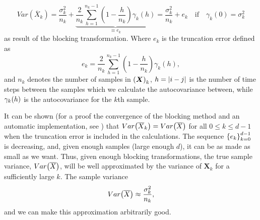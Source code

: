 \begin{equation*}
Var(\overline{X}_k) = \frac{\sigma_k^2}{n_k} + \underbrace{\frac{2}{n_k} \sum_{h=1}^{n_k-1}\left( 1 - \frac{h}{n_k} \right)\gamma_k(h)}_{\equiv e_k} = \frac{\sigma^2_k}{n_k} + e_k \quad \text{if} \quad \gamma_k(0) = \sigma_k^2
\label{eq:var_bloc} 
\end{equation*}
as result of the blocking transformation. Where $e_k$ is the truncation error defined as
\begin{equation*}
e_k = \frac{2}{n_k} \sum_{h=1}^{n_k-1}\left( 1 - \frac{h}{n_k} \right)\gamma_k(h), 
\label{eq:truncartion} 
\end{equation*}
and $n_k$ denotes the number of samples in $\qty(\bm{X})_k$, $h=\abs{i-j}$ is the number of time steps between the samples which we calculate the autocovariance between, while $\gamma_k\qty(h)$ is the autocovariance for the $k$th sample. 

It can be shown (for a proof the convergence of the blocking method and an automatic implementation, see \citep{MariusJonsson}) that $Var\qty(\overline{X}_k)=Var\qty(\overline{X})$  for all $0 \leq k \leq d-1$ when the truncation error is included in the calculations. The sequence $\qty{e_k}_{k=0}^{d-1}$ is decreasing, and, given enough samples (large enough $d$), it can be as made as small as we want. Thus, given enough blocking transformations, the true sample variance, $Var\qty(\overline{X})$, will be well approximated by the variance of $\bm{X}_k$ for a sufficiently large $k$. The sample variance 
\begin{equation}
    Var\qty(\overline{X}) \approx \frac{\sigma_k^2}{n_k}, 
\end{equation}
and we can make this approximation arbitrarily good.





